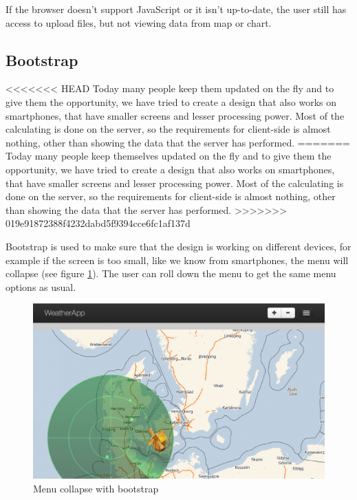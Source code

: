 If the browser doesn't support JavaScript or it isn't up-to-date, the user still has access to upload files, but not viewing data from map or chart.

\subsection{Bootstrap}
<<<<<<< HEAD
Today many people keep them updated on the fly and to give them the opportunity, we have tried to create a design that also works on smartphones, that have smaller screens and lesser processing power. Most of the calculating is done on the server, so the requirements for client-side is almost nothing, other than showing the data that the server has performed.
=======
Today many people keep themselves updated on the fly and to give them the opportunity, we have tried to create a design that also works on smartphones, that have smaller screens and lesser processing power. Most of the calculating is done on the server, so the requirements for client-side is almost nothing, other than showing the data that the server has performed.
>>>>>>> 019e91872388f4232dabd5f9394cce6fc1af137d

Bootstrap is used to make sure that the design is working on different devices, for example if the screen is too small, like we know from smartphones, the menu will collapse (see figure \ref{fig:bootstrap}). The user can roll down the menu to get the same menu options as usual.

\begin{figure}[htbp]
\centering
   \includegraphics[scale=.5]{figure/bootstrap.eps}
   \caption{Menu collapse with bootstrap}
   \label{fig:bootstrap}
\end{figure}

